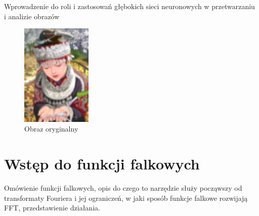 Wprowadzenie do roli i zastosowań głębokich sieci neuronowych w przetwarzaniu i analizie obrazów

\begin{figure}[ht]
    \includegraphics[width=0.3\textwidth]{Rozdziały/02.Podstawy_teoretyczne/comic.png}
    \centering
    \caption{Obraz oryginalny}
    \label{fig:imagex}
\end{figure}

\section{Wstęp do funkcji falkowych}


Omówienie funkcji falkowych, opis do czego to narzędzie służy począwszy od transformaty Fouriera i jej ograniczeń, 
w jaki sposób funkcje falkowe rozwijają FFT, przedstawienie działania.




